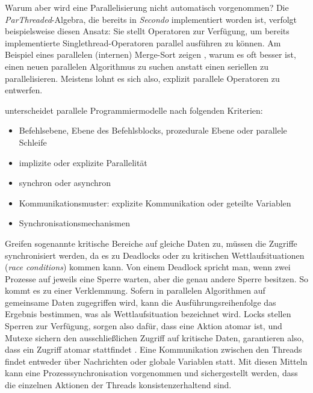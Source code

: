 \documentclass[a4paper,12pt,twoside]{article}
\newcommand{\Fb}[1]{\textit{#1}} %
\begin{document}
Warum aber wird eine Parallelisierung nicht automatisch vorgenommen? Die \Fb{ParThreaded}-Algebra, die bereits in \Fb{Secondo} implementiert worden ist, verfolgt beispielsweise
diesen Ansatz: Sie stellt Operatoren zur Verfügung, um bereits implementierte Singlethread-Operatoren parallel ausführen zu können. Am Beispiel eines parallelen (internen) Merge-Sort zeigen {\textcite{McCool2012}}, warum es oft besser ist, einen neuen parallelen Algorithmus zu suchen anstatt einen seriellen zu parallelisieren. Meistens lohnt es sich also, explizit parallele Operatoren zu entwerfen.

{\textcite[S.104]{Rauber2013}} unterscheidet parallele Programmiermodelle nach folgenden Kriterien:

\begin{itemize}
	\item Befehlsebene, Ebene des Befehlsblocks, prozedurale Ebene oder parallele Schleife
	\item implizite oder explizite Parallelität
	\item synchron oder asynchron
	\item Kommunikationsmuster: explizite Kommunikation oder geteilte Variablen
	\item Synchronisationsmechanismen
\end{itemize} 

Greifen sogenannte kritische Bereiche auf gleiche Daten zu, müssen die Zugriffe synchronisiert werden, da es zu Deadlocks oder zu kritischen Wettlaufsituationen (\Fb{race conditions}) kommen kann. Von einem Deadlock spricht man, wenn zwei Prozesse auf jeweils eine Sperre warten, aber die genau andere Sperre besitzen. So kommt es zu einer Verklemmung. Sofern in parallelen Algorithmen auf gemeinsame Daten zugegriffen wird, kann die Ausführungsreihenfolge das Ergebnis bestimmen, was als Wettlaufsituation bezeichnet wird. Locks stellen Sperren zur Verfügung, sorgen also dafür, dass eine Aktion atomar ist, und Mutexe sichern den ausschließlichen Zugriff auf kritische Daten, garantieren also, dass ein Zugriff atomar stattfindet \parencite{Rauber2013}. Eine Kommunikation zwischen den Threads findet entweder über Nachrichten oder globale Variablen statt. Mit diesen Mitteln kann eine Prozesssynchronisation vorgenommen und sichergestellt werden, dass die einzelnen Aktionen der Threads konsistenzerhaltend sind.
\end{document}
